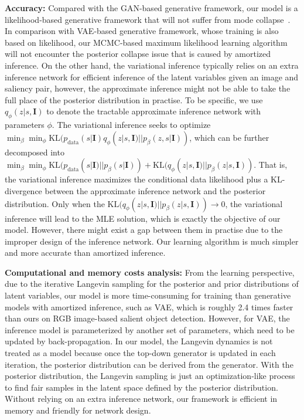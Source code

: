 \documentclass{article}
\begin{document}
\noindent\textbf{Accuracy:} Compared with the GAN-based generative framework, our model is a likelihood-based generative framework that will not suffer from mode collapse~\cite{AroraRZ18}. In comparison with VAE-based generative framework, whose training is also based on likelihood, our MCMC-based maximum likelihood learning algorithm will not encounter the posterior collapse issue that is caused by amortized inference. On the other hand, the variational inference typically relies on an extra inference network for efficient inference of the latent variables given an image and saliency pair, however, the approximate inference might not be able to take the full place of the posterior distribution in practise. To be specific, we use $q_{\phi}(z|s,\textbf{I})$ to denote the tractable approximate inference network with parameters $\phi$. The variational inference seeks to optimize
$\min_{\beta} \min_{\phi} \text{KL}(p_{\text{data}}(s|\textbf{I})q_{\phi}(z|s,\textbf{I})||p_{\beta}(z,s|\textbf{I}))$, which can be further decomposed into $\min_{\beta} \min_{\phi} \text{KL}(p_{\text{data}}(s|\textbf{I})|| p_{\beta}(s|\textbf{I})) + \text{KL}( q_{\phi}(z|s,\textbf{I})  || p_{\beta}(z|s,\textbf{I}))$. That is, the variational inference maximizes the conditional data likelihood plus a KL-divergence between the approximate inference network and the posterior distribution. Only when the $\text{KL}( q_{\phi}(z|s,\textbf{I}) || p_{\beta}(z|s,\textbf{I})) \rightarrow 0$, the variational inference will lead to the MLE solution, which is exactly the objective of our model. However, there might exist a gap between them in practise due to the improper design of the inference network. Our learning algorithm is much simpler and more accurate than amortized inference.       

\noindent\textbf{Computational and memory costs analysis:} From the learning perspective, due to the iterative Langevin sampling for the posterior and prior distributions of latent variables, our model is more time-consuming for training than generative models with amortized inference, such as VAE, which is
roughly 2.4 times faster than ours on RGB image-based salient object detection. However, for VAE, the inference model is parameterized by another set of parameters, which need to be updated by back-propagation. In our model, the Langevin dynamics is not treated as a model because once the top-down generator is updated in each iteration, the posterior distribution can be derived from the generator. With the posterior distribution, the Langevin sampling is just an optimization-like process to find fair samples in the latent space defined by the posterior distribution. Without relying on an extra inference network, our framework is efficient in memory and friendly for network design. 
\end{document}
